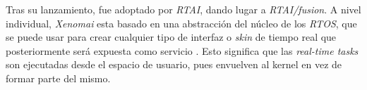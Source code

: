
Tras su lanzamiento, fue adoptado por \textit{RTAI}, dando lugar a \textit{RTAI/fusion}. A nivel individual, \textit{Xenomai} esta basado en una abstracción del núcleo de los \textit{RTOS}, que se puede usar para crear cualquier tipo de interfaz o \textit{skin} de tiempo real que posteriormente será expuesta como servicio \cite{DENXTeam2021}. Esto significa que las \textit{real-time tasks} son ejecutadas desde el espacio de usuario, pues envuelven al kernel en vez de formar parte del mismo.
